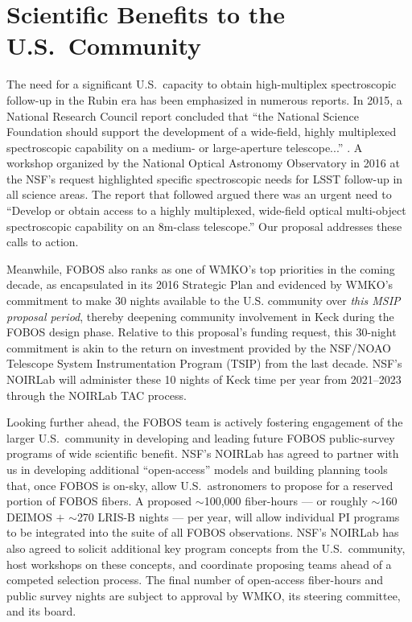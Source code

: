 \documentclass[oneside,11pt]{amsart}
\begin{document}

\section{Scientific Benefits to the U.S.\ Community}
\label{sec:community}

The need for a significant U.S.\ capacity to obtain high-multiplex spectroscopic follow-up in the Rubin era has been
emphasized in numerous reports.  In 2015, a National Research Council report concluded that ``the National Science
Foundation should support the development of a wide-field, highly multiplexed spectroscopic capability on a medium- or
large-aperture telescope...'' \citep{NAP21722}.  A workshop organized by the National Optical Astronomy Observatory in
2016 at the NSF's request highlighted specific spectroscopic needs for LSST follow-up in all science areas.  The report
that followed argued there was an urgent need to ``Develop or obtain access to a highly multiplexed, wide-field optical
multi-object spectroscopic capability on an 8m-class telescope.''  Our proposal addresses these calls to action.

Meanwhile, FOBOS also ranks as one of WMKO’s top priorities in the coming decade, as encapsulated in its 2016 Strategic
Plan and evidenced by WMKO’s commitment to make 30 nights available to the U.S. community over \emph{this MSIP proposal
period}, thereby deepening community involvement in Keck during the FOBOS design phase.  Relative to this proposal's
funding request, this 30-night commitment is akin to the return on investment provided by the NSF/NOAO Telescope System
Instrumentation Program (TSIP) from the last decade.  NSF's NOIRLab will administer these 10 nights of Keck time per
year from 2021--2023 through the NOIRLab TAC process.

Looking further ahead, the FOBOS team is actively fostering engagement of the larger U.S.\ community in developing and
leading future FOBOS public-survey programs of wide scientific benefit. NSF's NOIRLab has agreed to partner with us in
developing additional ``open-access'' models and building planning tools that, once FOBOS is on-sky, allow U.S.\
astronomers to propose for a reserved portion of FOBOS fibers. A proposed $\sim$100,000 fiber-hours --- or roughly
$\sim$160 DEIMOS $+$ $\sim$270 LRIS-B nights --- per year, will allow individual PI programs to be integrated into the
suite of all FOBOS observations.  NSF's NOIRLab has also agreed to solicit additional key program concepts from the
U.S.\ community, host workshops on these concepts, and coordinate proposing teams ahead of a competed selection
process.  The final number of open-access fiber-hours and public survey nights are subject to approval by WMKO, its
steering committee, and its board.
\end{document}
